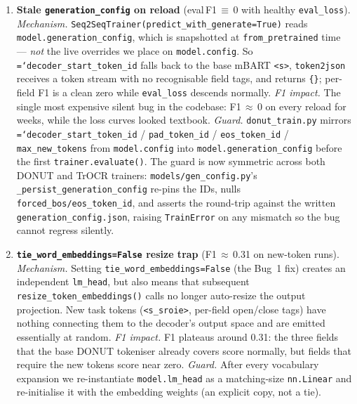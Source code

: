 \documentclass[conference]{IEEEtran}
\newcommand{\code}[1]{\texttt{\hyphenchar\font=`\-\relax #1}}
\begin{document}
\begin{enumerate}
\item \textbf{Stale \texttt{generation\_config} on reload}
  (eval\,F1\,$\equiv$\,0 with healthy \texttt{eval\_loss}).
  \textit{Mechanism.} \texttt{Seq2SeqTrainer}\-\texttt{(predict\_with\_generate=True)}
  reads \texttt{model.generation\_config}, which is snapshotted at
  \texttt{from\_pretrained} time --- \emph{not} the live overrides
  we place on \texttt{model.config}.  So
  \code{decoder\_start\_token\_id} falls back to the base mBART
  \texttt{<s>}, \texttt{token2json} receives a token stream with no
  recognisable field tags, and returns \texttt{\{\}}; per-field F1
  is a clean zero while \texttt{eval\_loss} descends normally.
  \textit{F1 impact.} The single most expensive silent bug in the
  codebase: F1\,$\approx$\,0 on every reload for weeks, while the
  loss curves looked textbook.  \textit{Guard.}
  \texttt{donut\_train.py} mirrors
  \code{decoder\_start\_token\_id} / \texttt{pad\_token\_id} /
  \texttt{eos\_token\_id} / \texttt{max\_new\_tokens} from
  \texttt{model.config} into \texttt{model.generation\_config}
  before the first \texttt{trainer.evaluate()}.
  The guard is now symmetric across both DONUT and TrOCR trainers:
  \texttt{models/gen\_config.py}'s \texttt{\_persist\_generation\_config}
  re-pins the IDs, nulls \texttt{forced\_bos/eos\_token\_id}, and
  asserts the round-trip against the written
  \texttt{generation\_config.json}, raising \texttt{TrainError} on
  any mismatch so the bug cannot regress silently.

\item \textbf{\texttt{tie\_word\_embeddings=False} resize trap}
  (F1\,$\approx$\,0.31 on new-token runs).
  \textit{Mechanism.} Setting \texttt{tie\_word\_embeddings=False}
  (the Bug~1 fix) creates an independent \texttt{lm\_head}, but also
  means that subsequent \texttt{resize\_token\_embeddings()} calls
  no longer auto-resize the output projection.  New task tokens
  (\texttt{<s\_sroie>}, per-field open/close tags) have nothing
  connecting them to the decoder's output space and are emitted
  essentially at random.  \textit{F1 impact.} F1 plateaus around
  0.31: the three fields that the base DONUT tokeniser already
  covers score normally, but fields that require the new tokens
  score near zero.  \textit{Guard.} After every vocabulary expansion
  we re-instantiate \texttt{model.lm\_head} as a matching-size
  \texttt{nn.Linear} and re-initialise it with the embedding weights
  (an explicit copy, not a tie).


\end{enumerate}
\end{document}
